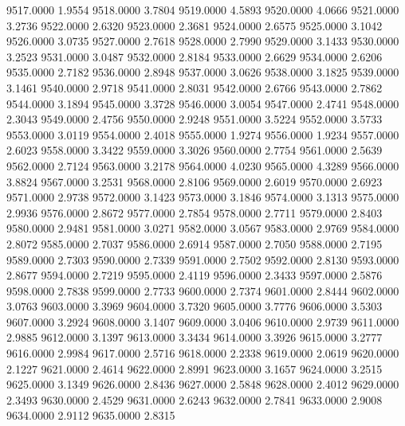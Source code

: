 9517.0000      1.9554
9518.0000      3.7804
9519.0000      4.5893
9520.0000      4.0666
9521.0000      3.2736
9522.0000      2.6320
9523.0000      2.3681
9524.0000      2.6575
9525.0000      3.1042
9526.0000      3.0735
9527.0000      2.7618
9528.0000      2.7990
9529.0000      3.1433
9530.0000      3.2523
9531.0000      3.0487
9532.0000      2.8184
9533.0000      2.6629
9534.0000      2.6206
9535.0000      2.7182
9536.0000      2.8948
9537.0000      3.0626
9538.0000      3.1825
9539.0000      3.1461
9540.0000      2.9718
9541.0000      2.8031
9542.0000      2.6766
9543.0000      2.7862
9544.0000      3.1894
9545.0000      3.3728
9546.0000      3.0054
9547.0000      2.4741
9548.0000      2.3043
9549.0000      2.4756
9550.0000      2.9248
9551.0000      3.5224
9552.0000      3.5733
9553.0000      3.0119
9554.0000      2.4018
9555.0000      1.9274
9556.0000      1.9234
9557.0000      2.6023
9558.0000      3.3422
9559.0000      3.3026
9560.0000      2.7754
9561.0000      2.5639
9562.0000      2.7124
9563.0000      3.2178
9564.0000      4.0230
9565.0000      4.3289
9566.0000      3.8824
9567.0000      3.2531
9568.0000      2.8106
9569.0000      2.6019
9570.0000      2.6923
9571.0000      2.9738
9572.0000      3.1423
9573.0000      3.1846
9574.0000      3.1313
9575.0000      2.9936
9576.0000      2.8672
9577.0000      2.7854
9578.0000      2.7711
9579.0000      2.8403
9580.0000      2.9481
9581.0000      3.0271
9582.0000      3.0567
9583.0000      2.9769
9584.0000      2.8072
9585.0000      2.7037
9586.0000      2.6914
9587.0000      2.7050
9588.0000      2.7195
9589.0000      2.7303
9590.0000      2.7339
9591.0000      2.7502
9592.0000      2.8130
9593.0000      2.8677
9594.0000      2.7219
9595.0000      2.4119
9596.0000      2.3433
9597.0000      2.5876
9598.0000      2.7838
9599.0000      2.7733
9600.0000      2.7374
9601.0000      2.8444
9602.0000      3.0763
9603.0000      3.3969
9604.0000      3.7320
9605.0000      3.7776
9606.0000      3.5303
9607.0000      3.2924
9608.0000      3.1407
9609.0000      3.0406
9610.0000      2.9739
9611.0000      2.9885
9612.0000      3.1397
9613.0000      3.3434
9614.0000      3.3926
9615.0000      3.2777
9616.0000      2.9984
9617.0000      2.5716
9618.0000      2.2338
9619.0000      2.0619
9620.0000      2.1227
9621.0000      2.4614
9622.0000      2.8991
9623.0000      3.1657
9624.0000      3.2515
9625.0000      3.1349
9626.0000      2.8436
9627.0000      2.5848
9628.0000      2.4012
9629.0000      2.3493
9630.0000      2.4529
9631.0000      2.6243
9632.0000      2.7841
9633.0000      2.9008
9634.0000      2.9112
9635.0000      2.8315
